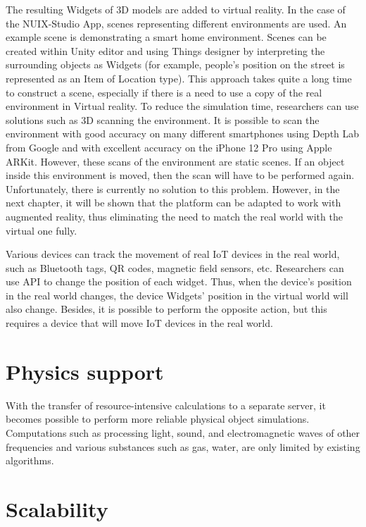 The resulting Widgets of 3D models are added to virtual reality. In the case of the NUIX-Studio App, scenes representing different environments are used. An example scene is demonstrating a smart home environment. Scenes can be created within Unity editor and using Things designer by interpreting the surrounding objects as Widgets (for example, people's position on the street is represented as an Item of Location type). This approach takes quite a long time to construct a scene, especially if there is a need to use a copy of the real environment in Virtual reality. To reduce the simulation time, researchers can use solutions such as 3D scanning the environment. It is possible to scan the environment with good accuracy on many different smartphones using Depth Lab from Google and with excellent accuracy on the iPhone 12 Pro using Apple ARKit. However, these scans of the environment are static scenes. If an object inside this environment is moved, then the scan will have to be performed again. Unfortunately, there is currently no solution to this problem. However, in the next chapter, it will be shown that the platform can be adapted to work with augmented reality, thus eliminating the need to match the real world with the virtual one fully.

Various devices can track the movement of real IoT devices in the real world, such as Bluetooth tags, QR codes, magnetic field sensors, etc. Researchers can use API to change the position of each widget. Thus, when the device's position in the real world changes, the device Widgets' position in the virtual world will also change. Besides, it is possible to perform the opposite action, but this requires a device that will move IoT devices in the real world.

\section{Physics support}

With the transfer of resource-intensive calculations to a separate server, it becomes possible to perform more reliable physical object simulations. Computations such as processing light, sound, and electromagnetic waves of other frequencies and various substances such as gas, water, are only limited by existing algorithms.

\section{Scalability}


